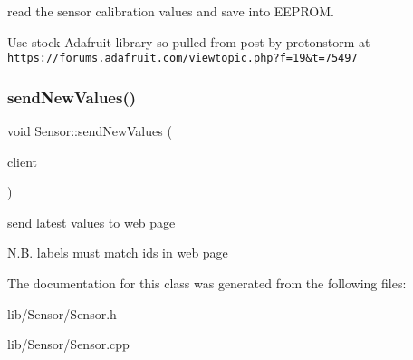 read the sensor calibration values and save into E\+E\+P\+R\+OM. 

Use stock Adafruit library so pulled from post by protonstorm at \href{https://forums.adafruit.com/viewtopic.php?f=19&t=75497}{\tt https\+://forums.\+adafruit.\+com/viewtopic.\+php?f=19\&t=75497} \mbox{\label{class_sensor_afd75951a11c5609b995e270e4c087948}} 
\subsubsection{\texorpdfstring{send\+New\+Values()}{sendNewValues()}}
{\footnotesize\ttfamily void Sensor\+::send\+New\+Values (\begin{DoxyParamCaption}\item[{Wi\+Fi\+Client}]{client }\end{DoxyParamCaption})}



send latest values to web page 

N.\+B. labels must match ids in web page 

The documentation for this class was generated from the following files\+:\begin{DoxyCompactItemize}
\item 
lib/\+Sensor/Sensor.\+h\item 
lib/\+Sensor/Sensor.\+cpp\end{DoxyCompactItemize}

